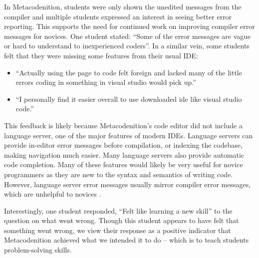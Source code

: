 \documentclass[sigconf,anonymous]{acmart}
\begin{document}
In Metacodenition, students were only shown the unedited messages from the compiler and multiple students expressed an interest in seeing better error reporting.  This supports the need for continued work on improving compiler error messages for novices.  One student stated: ``Some of the error messages are vague or hard to understand to inexperienced coders''.  
In a similar vein, some students felt that they were missing some features from their usual IDE:
\begin{itemize}
    \item ``Actually using the page to code felt foreign and lacked many of the little errors coding in something in visual studio would pick up.''
    \item ``I personally find it easier overall to use downloaded ide like visual studio code.''
\end{itemize}

This feedback is likely because Metacodenition's code editor did not include a language server, one of the major features of modern IDEs. Language servers can provide in-editor error messages before compilation, or indexing the codebase, making navigation much easier. Many language servers also provide automatic code completion. Many of these features would likely be very useful for novice programmers as they are new to the syntax and semantics of writing code. However, language server error messages usually mirror compiler error messages, which are unhelpful to novices \cite{prather2017}.

Interestingly, one student responded, ``Felt like learning a new skill'' to the question on what went wrong. Though this student appears to have felt that something went wrong, we view their response as a positive indicator that Metacodenition achieved what we intended it to do -- which is to teach students problem-solving skills.
\end{document}
